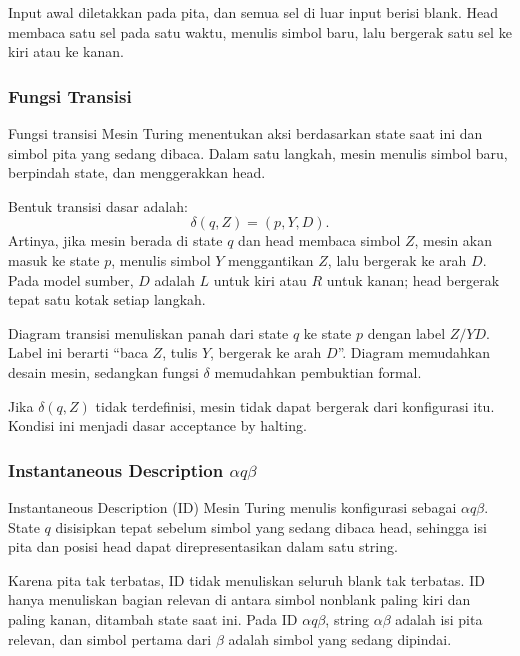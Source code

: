 Input awal diletakkan pada pita, dan semua sel di luar input berisi blank. Head membaca satu sel pada satu waktu, menulis simbol baru, lalu bergerak satu sel ke kiri atau ke kanan.

\subsubsection{Fungsi Transisi}

\begin{jawab}
Fungsi transisi Mesin Turing menentukan aksi berdasarkan state saat ini dan simbol pita yang sedang dibaca. Dalam satu langkah, mesin menulis simbol baru, berpindah state, dan menggerakkan head.
\end{jawab}

Bentuk transisi dasar adalah:
\[
    \delta(q,Z)=(p,Y,D).
\]
Artinya, jika mesin berada di state $q$ dan head membaca simbol $Z$, mesin akan masuk ke state $p$, menulis simbol $Y$ menggantikan $Z$, lalu bergerak ke arah $D$. Pada model sumber, $D$ adalah $L$ untuk kiri atau $R$ untuk kanan; head bergerak tepat satu kotak setiap langkah.

Diagram transisi menuliskan panah dari state $q$ ke state $p$ dengan label $Z/YD$. Label ini berarti ``baca $Z$, tulis $Y$, bergerak ke arah $D$''. Diagram memudahkan desain mesin, sedangkan fungsi $\delta$ memudahkan pembuktian formal.

Jika $\delta(q,Z)$ tidak terdefinisi, mesin tidak dapat bergerak dari konfigurasi itu. Kondisi ini menjadi dasar acceptance by halting.

\subsubsection{\texorpdfstring{Instantaneous Description $\alpha q\beta$}{Instantaneous Description alpha q beta}}

\begin{jawab}
Instantaneous Description (ID) Mesin Turing menulis konfigurasi sebagai $\alpha q\beta$. State $q$ disisipkan tepat sebelum simbol yang sedang dibaca head, sehingga isi pita dan posisi head dapat direpresentasikan dalam satu string.
\end{jawab}

Karena pita tak terbatas, ID tidak menuliskan seluruh blank tak terbatas. ID hanya menuliskan bagian relevan di antara simbol nonblank paling kiri dan paling kanan, ditambah state saat ini. Pada ID $\alpha q\beta$, string $\alpha\beta$ adalah isi pita relevan, dan simbol pertama dari $\beta$ adalah simbol yang sedang dipindai.


